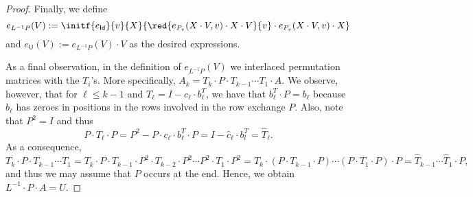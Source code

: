 \begin{proof}

Finally, we define
$$
e_{L^{-1}P}(V):=\initf{e_{\mathsf{Id}}}{v}{X}{\red{e_{P_v}(X\cdot V,v)\cdot X\cdot V}{v}\cdot e_{P_v}(X\cdot V,v)\cdot X}
$$
and $e_{\mathsf{U}}(V):=e_{L^{-1}P}(V)\cdot V$ as the desired expressions.

As a final observation, in the definition of $e_{L^{-1}P}(V)$ 
we interlaced permutation matrices with the $T_i$'s. More specifically, 
$A_k=T_k\cdot P\cdot T_{k-1}\cdots T_1\cdot A$. We observe, however, that for $\ell\leq k-1$ and
$T_{\ell}=I-c_\ell\cdot b_\ell^T$, we have that  $b_\ell^T\cdot P=b_\ell$ because $b_\ell$ has zeroes in positions in the rows involved in the row exchange $P$. Also, note that  $P^2=I$ and thus 
$$P\cdot T_\ell\cdot P=P^2-P\cdot c_\ell\cdot b_\ell^T\cdot P=I-\widehat{c}_\ell\cdot b_l^T=\widehat{T}_\ell.$$
%
%
As a consequence,
$$
T_k\cdot P\cdot T_{k-1}\cdots T_1=T_k\cdot P\cdot T_{k-1}\cdot P^2\cdot T_{k-2}\cdot P^2\cdots P^2 \cdot T_1\cdot P^2=T_k\cdot (P\cdot T_{k-1}\cdot P)\cdots (P\cdot T_1\cdot P)\cdot P=\widehat{T}_{k-1}\cdots \widehat{T}_1\cdot P,
$$
and thus we may assume that $P$ occurs at the end. Hence, we obtain $L^{-1}\cdot P\cdot A=U$.
%
%
\end{proof}


